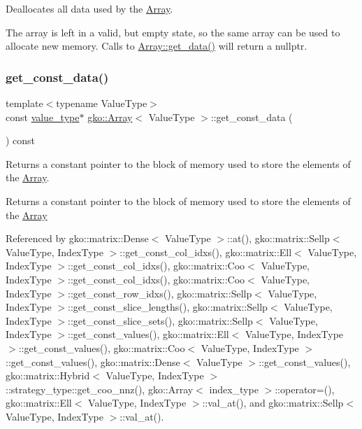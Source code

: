 Deallocates all data used by the \hyperlink{classgko_1_1Array}{Array}. 

The array is left in a valid, but empty state, so the same array can be used to allocate new memory. Calls to \hyperlink{classgko_1_1Array_a9acf29878703bb8767e3cea2ba499dae}{Array\+::get\+\_\+data()} will return a {\ttfamily nullptr}. \mbox{\label{classgko_1_1Array_a5a46e0920b649cdb062f5e415922d1aa}} 
\subsubsection{\texorpdfstring{get\+\_\+const\+\_\+data()}{get\_const\_data()}}
{\footnotesize\ttfamily template$<$typename Value\+Type$>$ \\
const \hyperlink{classgko_1_1Array_ad40c95e429262175cae51bcabd291a5b}{value\+\_\+type}$\ast$ \hyperlink{classgko_1_1Array}{gko\+::\+Array}$<$ Value\+Type $>$\+::get\+\_\+const\+\_\+data (\begin{DoxyParamCaption}{ }\end{DoxyParamCaption}) const\hspace{0.3cm}{\ttfamily [noexcept]}}



Returns a constant pointer to the block of memory used to store the elements of the \hyperlink{classgko_1_1Array}{Array}. 

\begin{DoxyReturn}{Returns}
a constant pointer to the block of memory used to store the elements of the \hyperlink{classgko_1_1Array}{Array} 
\end{DoxyReturn}


Referenced by gko\+::matrix\+::\+Dense$<$ Value\+Type $>$\+::at(), gko\+::matrix\+::\+Sellp$<$ Value\+Type, Index\+Type $>$\+::get\+\_\+const\+\_\+col\+\_\+idxs(), gko\+::matrix\+::\+Ell$<$ Value\+Type, Index\+Type $>$\+::get\+\_\+const\+\_\+col\+\_\+idxs(), gko\+::matrix\+::\+Coo$<$ Value\+Type, Index\+Type $>$\+::get\+\_\+const\+\_\+col\+\_\+idxs(), gko\+::matrix\+::\+Coo$<$ Value\+Type, Index\+Type $>$\+::get\+\_\+const\+\_\+row\+\_\+idxs(), gko\+::matrix\+::\+Sellp$<$ Value\+Type, Index\+Type $>$\+::get\+\_\+const\+\_\+slice\+\_\+lengths(), gko\+::matrix\+::\+Sellp$<$ Value\+Type, Index\+Type $>$\+::get\+\_\+const\+\_\+slice\+\_\+sets(), gko\+::matrix\+::\+Sellp$<$ Value\+Type, Index\+Type $>$\+::get\+\_\+const\+\_\+values(), gko\+::matrix\+::\+Ell$<$ Value\+Type, Index\+Type $>$\+::get\+\_\+const\+\_\+values(), gko\+::matrix\+::\+Coo$<$ Value\+Type, Index\+Type $>$\+::get\+\_\+const\+\_\+values(), gko\+::matrix\+::\+Dense$<$ Value\+Type $>$\+::get\+\_\+const\+\_\+values(), gko\+::matrix\+::\+Hybrid$<$ Value\+Type, Index\+Type $>$\+::strategy\+\_\+type\+::get\+\_\+coo\+\_\+nnz(), gko\+::\+Array$<$ index\+\_\+type $>$\+::operator=(), gko\+::matrix\+::\+Ell$<$ Value\+Type, Index\+Type $>$\+::val\+\_\+at(), and gko\+::matrix\+::\+Sellp$<$ Value\+Type, Index\+Type $>$\+::val\+\_\+at().

